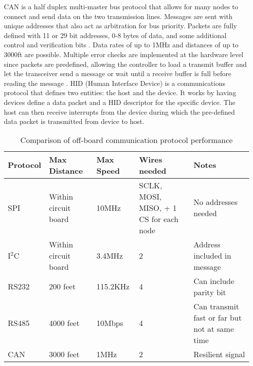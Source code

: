 \newline
CAN is a half duplex multi-master bus protocol that allows for many nodes to connect and send data on the two transmission lines. Messages are sent with unique addresses that also act as arbitration for bus priority. Packets are fully defined with 11 or 29 bit addresses, 0-8 bytes of data, and some additional control and verification bits \cite{CAN_Guide,CAN_Requirements}. Data rates of up to 1MHz and distances of up to 3000ft are possible. Multiple error checks are implemented at the hardware level since packets are predefined, allowing the controller to load a transmit buffer and let the transceiver send a message or wait until a receive buffer is full before reading the message \cite{CANvSPI}. 
\newline
HID (Human Interface Device) is a communications protocol that defines two entities: the host and the device.  It works by having devices define a data packet and a HID descriptor for the specific device.  The host can then receive interrupts from the device during which the pre-defined data packet is transmitted from device to host.  

\begin{table}[H]
	\begin{center}
		\begin{tabular} {| l | l | p{2cm} | p{2.5cm} | p{2.5cm} |}
			\hline
			Protocol & Max Distance & Max Speed & Wires needed & Notes \\ \hline
			SPI & Within circuit board & 10MHz & SCLK, MOSI, MISO, + 1 CS for each node & No addresses needed
			\\ \hline
			I$^2$C & Within circuit board & 3.4MHz & 2 & Address included in message
			\\ \hline
			RS232 & 200 feet & 115.2KHz & 4 & Can include parity bit
			\\ \hline
			RS485 & 4000 feet & 10Mbps & 4 & Can transmit fast or far but not at same time
			\\ \hline
			CAN & 3000 feet & 1MHz & 2 & Resilient signal
			\\ \hline
		\end{tabular}
	\end{center}
	\caption{Comparison of off-board communication protocol performance}
	\label{tbl:Comm_Compare}
\end{table}


